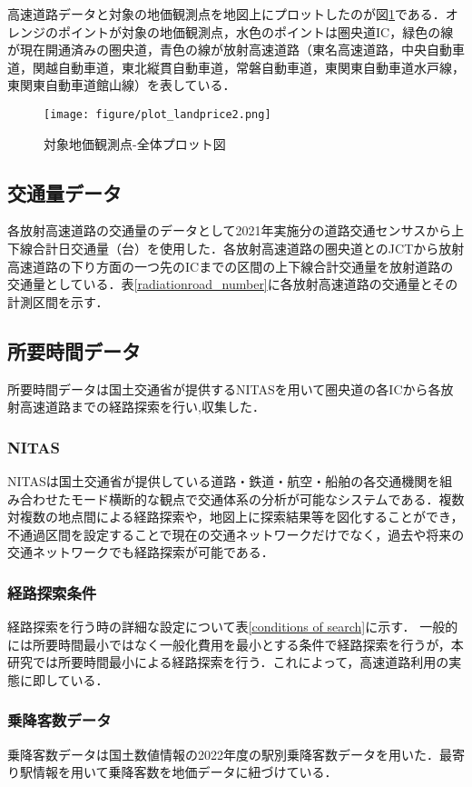 高速道路データと対象の地価観測点を地図上にプロットしたのが図\ref{plot_landprice}である．オレンジのポイントが対象の地価観測点，水色のポイントは圏央道IC，緑色の線が現在開通済みの圏央道，青色の線が放射高速道路（東名高速道路，中央自動車道，関越自動車道，東北縦貫自動車道，常磐自動車道，東関東自動車道水戸線，東関東自動車道館山線）を表している．
\begin{figure}[H]
  \centering
  \texttt{[image: figure/plot\_landprice2.png]}
  \caption{対象地価観測点-全体プロット図}
  \label{plot_landprice}
\end{figure}

\subsection{交通量データ}
各放射高速道路の交通量のデータとして2021年実施分の道路交通センサスから上下線合計日交通量（台）を使用した．各放射高速道路の圏央道とのJCTから放射高速道路の下り方面の一つ先のICまでの区間の上下線合計交通量を放射道路の交通量としている．表\ref{radiationroad_number}に各放射高速道路の交通量とその計測区間を示す．


\subsection{所要時間データ}
所要時間データは国土交通省が提供するNITASを用いて圏央道の各ICから各放射高速道路までの経路探索を行い,収集した．

\subsubsection{NITAS}
NITASは国土交通省が提供している道路・鉄道・航空・船舶の各交通機関を組み合わせたモード横断的な観点で交通体系の分析が可能なシステムである．複数対複数の地点間による経路探索や，地図上に探索結果等を図化することができ，不通過区間を設定することで現在の交通ネットワークだけでなく，過去や将来の交通ネットワークでも経路探索が可能である．\cite{NITAS}

\subsubsection{経路探索条件}
経路探索を行う時の詳細な設定について表\ref{conditions of search}に示す．
一般的には所要時間最小ではなく一般化費用を最小とする条件で経路探索を行うが，本研究では所要時間最小による経路探索を行う．これによって，高速道路利用の実態に即している．


\subsubsection{乗降客数データ}
乗降客数データは国土数値情報の2022年度の駅別乗降客数データを用いた．最寄り駅情報を用いて乗降客数を地価データに紐づけている．
\newpage
